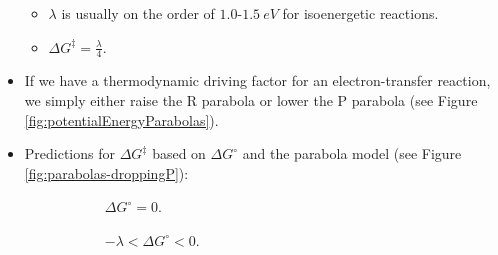 \documentclass[../notes.tex]{subfiles}
\begin{document}
\begin{itemize}
\begin{itemize}
        \item $\lambda$ is usually on the order of $1.0$-$\SI{1.5}{eV}$ for isoenergetic reactions.
        \item $\Delta G^\ddagger=\frac{\lambda}{4}$.
    \end{itemize}
    \item If we have a thermodynamic driving factor for an electron-transfer reaction, we simply either raise the R parabola or lower the P parabola (see Figure \ref{fig:potentialEnergyParabolas}).
    \item Predictions for $\Delta G^\ddagger$ based on $\Delta G^\circ$ and the parabola model (see Figure \ref{fig:parabolas-droppingP}):
    \begin{figure}[h!]
        \centering
        \begin{subfigure}[b]{0.24\linewidth}
            \centering
            \caption{$\Delta G^\circ=0$.}
            \label{fig:parabolas-droppingPa}
        \end{subfigure}
        \begin{subfigure}[b]{0.24\linewidth}
            \centering
            \caption{$-\lambda<\Delta G^\circ<0$.}
            \label{fig:parabolas-droppingPb}
        \end{subfigure}
        \begin{subfigure}[b]{0.24\linewidth}
            \centering
\end{subfigure}
\end{figure}
\end{itemize}
\end{document}
